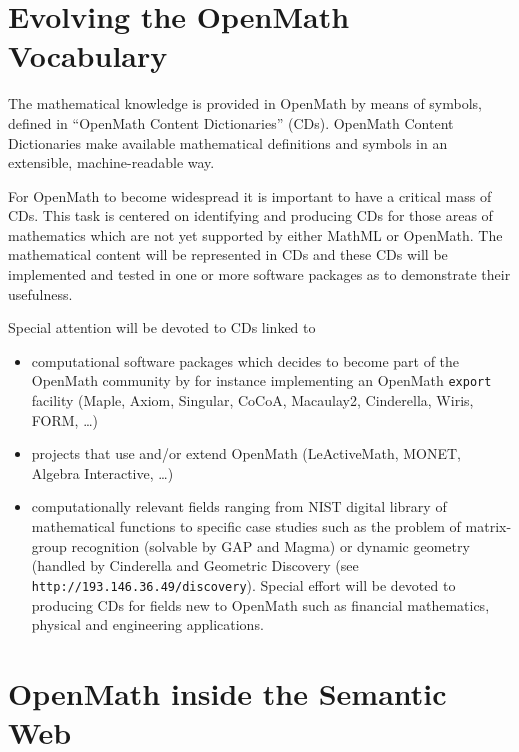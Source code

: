 \documentclass{euproposal}
\begin{document}
\section{Evolving the OpenMath Vocabulary}
\label{sec:OCD}

The mathematical knowledge is provided in OpenMath by means of
symbols, defined in ``OpenMath Content Dictionaries'' (CDs).  OpenMath
Content Dictionaries make available mathematical definitions and
symbols in an extensible, machine-readable way.

For OpenMath to become widespread it is important to have a critical
mass of CDs. This task is centered on identifying and producing CDs
for those areas of mathematics which are not yet supported by either
MathML or OpenMath. The mathematical content will be represented in
CDs and these CDs will be implemented and tested in one or more
software packages as to demonstrate their usefulness.

Special attention will be devoted to CDs linked to 
\begin{itemize}
  
\item computational software packages which decides to become part of
  the OpenMath community by for instance implementing an OpenMath
  \texttt{export} facility (Maple, Axiom, Singular, CoCoA, Macaulay2,
  Cinderella, Wiris, FORM, \ldots)
  
\item projects that use and/or extend OpenMath (LeActiveMath, MONET,
  Algebra Interactive, \ldots)
  
\item computationally relevant fields ranging from NIST digital
  library of mathematical functions to specific case studies such as
  the problem of matrix-group recognition (solvable by GAP and Magma)
  or dynamic geometry (handled by Cinderella and Geometric Discovery
(see \verb`http://193.146.36.49/discovery`). Special
  effort will be devoted to producing CDs for fields new to OpenMath
  such as financial mathematics, physical and engineering
  applications.

\end{itemize}






\section{OpenMath inside the Semantic Web}
\end{document}
